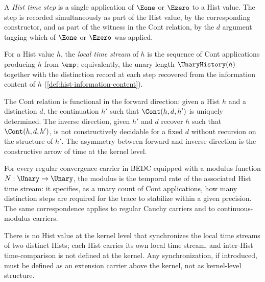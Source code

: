 \begin{definition}
\label{def:hist-time-step}
A \emph{Hist time step} is a single application of \(\Eone\) or \(\Ezero\) to a Hist value. The step is recorded simultaneously as part of the Hist value, by the corresponding constructor, and as part of the witness in the Cont relation, by the \(d\) argument tagging which of \(\Eone\) or \(\Ezero\) was applied.
\end{definition}
\begin{definition}
\label{def:hist-local-time-stream}
For a Hist value \(h\), the \emph{local time stream} of \(h\) is the sequence of Cont applications producing \(h\) from \(\emp\); equivalently, the unary length \(\UnaryHistory(h)\) together with the distinction record at each step recovered from the information content of \(h\) (\autoref{def:hist-information-content}).
\end{definition}
\begin{theorem}
\label{thm:cont-time-asymmetric}
The Cont relation is functional in the forward direction: given a Hist \(h\) and a distinction \(d\), the continuation \(h'\) such that \(\Cont(h, d, h')\) is uniquely determined. The inverse direction, given \(h'\) and \(d\) recover \(h\) such that \(\Cont(h, d, h')\), is not constructively decidable for a fixed \(d\) without recursion on the structure of \(h'\). The asymmetry between forward and inverse direction is the constructive arrow of time at the kernel level.
\end{theorem}
\begin{theorem}
\label{thm:modulus-temporal-rate}
For every regular convergence carrier in BEDC equipped with a modulus function \(N : \Unary \to \Unary\), the modulus is the temporal rate of the associated Hist time stream: it specifies, as a unary count of Cont applications, how many distinction steps are required for the trace to stabilize within a given precision. The same correspondence applies to regular Cauchy carriers and to continuous-modulus carriers.
\end{theorem}
\begin{corollary}
\label{cor:no-global-clock}
There is no Hist value at the kernel level that synchronizes the local time streams of two distinct Hists; each Hist carries its own local time stream, and inter-Hist time-comparison is not defined at the kernel. Any synchronization, if introduced, must be defined as an extension carrier above the kernel, not as kernel-level structure.
\end{corollary}
